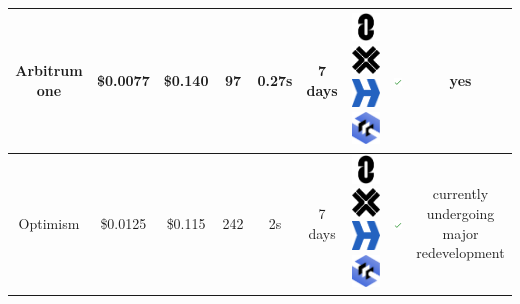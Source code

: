 \documentclass[fleqn,10pt]{olplainarticle}
\begin{document}
\begin{table}[H]
\begin{tabular}{|c|c|c|c|c|c|c|c|c|}
		Arbitrum one & \cellcolor[RGB]{200,255,0}\$0.0077 & \cellcolor[RGB]{255,100,0}\$0.140 & \cellcolor[RGB]{255,0,0}97 & \cellcolor[RGB]{0,255,0}0.27s & \cellcolor[RGB]{255,0,0}7 days\cite{arbitrum_frequently_2023} & \includegraphics[width=0.03\linewidth]{img/logoLayerZero} \includegraphics[width=0.03\linewidth]{img/logoAxelar} \includegraphics[width=0.03\linewidth]{img/logoHyperlane} \includegraphics[width=0.03\linewidth]{img/logoCCIP} & \includegraphics[width=0.03\linewidth]{img/check} & yes  \cite{arbitrum_fraud_2023} \\ \hline
		
		Optimism &  \cellcolor[RGB]{255,200,0}\$0.0125 & \cellcolor[RGB]{255,150,0}\$0.115 & \cellcolor[RGB]{255,50,0}242 & \cellcolor[RGB]{130,255,10}2s & \cellcolor[RGB]{255,0,0}7 days\cite{optimism_understanding_nodate}        & \includegraphics[width=0.03\linewidth]{img/logoLayerZero} \includegraphics[width=0.03\linewidth]{img/logoAxelar} \includegraphics[width=0.03\linewidth]{img/logoHyperlane} \includegraphics[width=0.03\linewidth]{img/logoCCIP} & \includegraphics[width=0.03\linewidth]{img/check} & \makecell{currently undergoing \\ major redevelopment\cite{optimism_fault_nodate}} \\ \hline
		

\end{tabular}
\end{table}
\end{document}
